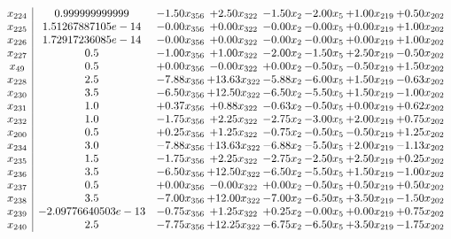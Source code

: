 \documentclass[8pt]{article}
\begin{document}
\[\begin{array}{c| c c@{\hskip 2pt} c@{\hskip 2pt} c@{\hskip 2pt} c@{\hskip 2pt} c@{\hskip 2pt} c@{\hskip 2pt} }
 x_{224}   &  0.999999999999 & -1.50 x_{356} & +  2.50 x_{322} & -1.50 x_{2} & -2.00 x_{5} & +  1.00 x_{219} & +  0.50 x_{202}\\
 x_{225}   &  1.51267887105e-14 & -0.00 x_{356} & +  0.00 x_{322} & -0.00 x_{2} & -0.00 x_{5} & +  0.00 x_{219} & +  1.00 x_{202}\\
 x_{226}   &  1.72917236085e-14 & -0.00 x_{356} & +  0.00 x_{322} & -0.00 x_{2} & -0.00 x_{5} & +  0.00 x_{219} & +  1.00 x_{202}\\
 x_{227}   &  0.5 & -1.00 x_{356} & +  1.00 x_{322} & -2.00 x_{2} & -1.50 x_{5} & +  2.50 x_{219} & -0.50 x_{202}\\
 x_{49}   &  0.5 & +  0.00 x_{356} & -0.00 x_{322} & +  0.00 x_{2} & -0.50 x_{5} & -0.50 x_{219} & +  1.50 x_{202}\\
 x_{228}   &  2.5 & -7.88 x_{356} & + 13.63 x_{322} & -5.88 x_{2} & -6.00 x_{5} & +  1.50 x_{219} & -0.63 x_{202}\\
 x_{230}   &  3.5 & -6.50 x_{356} & + 12.50 x_{322} & -6.50 x_{2} & -5.50 x_{5} & +  1.50 x_{219} & -1.00 x_{202}\\
 x_{231}   &  1.0 & +  0.37 x_{356} & +  0.88 x_{322} & -0.63 x_{2} & -0.50 x_{5} & +  0.00 x_{219} & +  0.62 x_{202}\\
 x_{232}   &  1.0 & -1.75 x_{356} & +  2.25 x_{322} & -2.75 x_{2} & -3.00 x_{5} & +  2.00 x_{219} & +  0.75 x_{202}\\
 x_{200}   &  0.5 & +  0.25 x_{356} & +  1.25 x_{322} & -0.75 x_{2} & -0.50 x_{5} & -0.50 x_{219} & +  1.25 x_{202}\\
 x_{234}   &  3.0 & -7.88 x_{356} & + 13.63 x_{322} & -6.88 x_{2} & -5.50 x_{5} & +  2.00 x_{219} & -1.13 x_{202}\\
 x_{235}   &  1.5 & -1.75 x_{356} & +  2.25 x_{322} & -2.75 x_{2} & -2.50 x_{5} & +  2.50 x_{219} & +  0.25 x_{202}\\
 x_{236}   &  3.5 & -6.50 x_{356} & + 12.50 x_{322} & -6.50 x_{2} & -5.50 x_{5} & +  1.50 x_{219} & -1.00 x_{202}\\
 x_{237}   &  0.5 & +  0.00 x_{356} & -0.00 x_{322} & +  0.00 x_{2} & -0.50 x_{5} & +  0.50 x_{219} & +  0.50 x_{202}\\
 x_{238}   &  3.5 & -7.00 x_{356} & + 12.00 x_{322} & -7.00 x_{2} & -6.50 x_{5} & +  3.50 x_{219} & -1.50 x_{202}\\
 x_{239}   &  -2.09776640503e-13 & -0.75 x_{356} & +  1.25 x_{322} & +  0.25 x_{2} & -0.00 x_{5} & +  0.00 x_{219} & +  0.75 x_{202}\\
 x_{240}   &  2.5 & -7.75 x_{356} & + 12.25 x_{322} & -6.75 x_{2} & -6.50 x_{5} & +  3.50 x_{219} & -1.75 x_{202}\\

\end{array}\]
\end{document}
